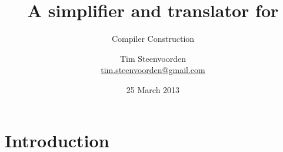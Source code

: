 

  {} 
  {}

\newcommand{\Label}[1]
  {\text{\sffamily #1}}

\newcommand    \Stm      {{\ensuremath{\mathcal{S}}}}
\newcommand    \Exp      {{\ensuremath{\mathcal{E}}}}
\newcommand    \Op       {{\ensuremath{\mathcal{O}}}}
\newcommand    \Stms     {{\ensuremath{\mathcal{S}^+}}}
\newcommand    \Exps     {{\ensuremath{\mathcal{E}^+}}}
\newcommand    \If       {\text{\ttfamily\bfseries if}}

\let\lbracket[
\let\rbracket]
\newcommand    \lBracket {\ensuremath{\lbracket\!\lbracket}}
\newcommand    \rBracket {\ensuremath{\rbracket\!\rbracket}}
\newcommand    \<        {\ensuremath{\langle}}
\renewcommand  \>        {\ensuremath{\rangle}}
\renewcommand  \[        {\ensuremath{\lBracket}}
\renewcommand  \]        {\ensuremath{\rBracket}}



\subtitle {Compiler Construction}
\title    {A simplifier and translator for \SPL}
\author   [Tim Steenvoorden]
          {Tim Steenvoorden\\
           \medskip
           {\small \url{tim.steenvoorden@gmail.com}}}%
\date     {25 March 2013}

\begin{frame}
  \titlepage
\end{frame}


\section{Introduction}
\subsection*{}

